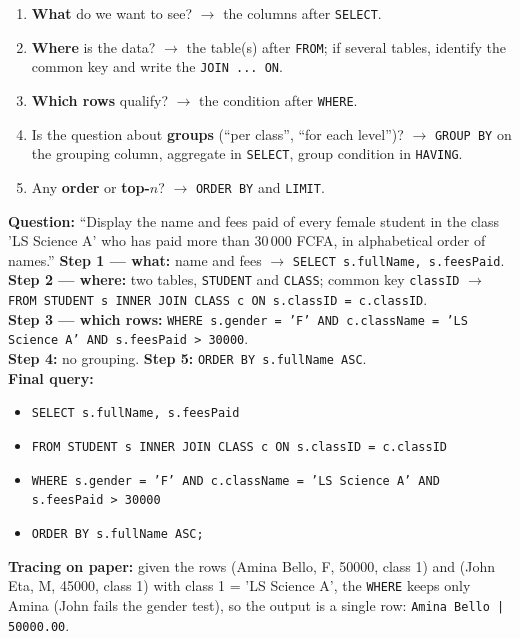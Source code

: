 \documentclass[11pt]{article}
\begin{document}
\begin{methode}
\begin{enumerate}
\item \textbf{What} do we want to see? $\rightarrow$ the columns after \texttt{SELECT}.
\item \textbf{Where} is the data? $\rightarrow$ the table(s) after \texttt{FROM}; if several tables, identify the common key and write the \texttt{JOIN ... ON}.
\item \textbf{Which rows} qualify? $\rightarrow$ the condition after \texttt{WHERE}.
\item Is the question about \textbf{groups} (``per class'', ``for each level'')? $\rightarrow$ \texttt{GROUP BY} on the grouping column, aggregate in \texttt{SELECT}, group condition in \texttt{HAVING}.
\item Any \textbf{order} or \textbf{top-$n$}? $\rightarrow$ \texttt{ORDER BY} and \texttt{LIMIT}.
\end{enumerate}
\end{methode}

\begin{exoresolu}
\textbf{Question:} ``Display the name and fees paid of every female student in the class 'LS Science A' who has paid more than 30\,000 FCFA, in alphabetical order of names.''
\tcblower
\textbf{Step 1 --- what:} name and fees $\rightarrow$ \texttt{SELECT s.fullName, s.feesPaid}.\\
\textbf{Step 2 --- where:} two tables, \texttt{STUDENT} and \texttt{CLASS}; common key \texttt{classID} $\rightarrow$ \texttt{FROM STUDENT s INNER JOIN CLASS c ON s.classID = c.classID}.\\
\textbf{Step 3 --- which rows:} \texttt{WHERE s.gender = 'F' AND c.className = 'LS Science A' AND s.feesPaid > 30000}.\\
\textbf{Step 4:} no grouping. \textbf{Step 5:} \texttt{ORDER BY s.fullName ASC}.\\[2pt]
\textbf{Final query:}
\begin{itemize}
\item \texttt{SELECT s.fullName, s.feesPaid}
\item \texttt{FROM STUDENT s INNER JOIN CLASS c ON s.classID = c.classID}
\item \texttt{WHERE s.gender = 'F' AND c.className = 'LS Science A' AND s.feesPaid > 30000}
\item \texttt{ORDER BY s.fullName ASC;}
\end{itemize}
\textbf{Tracing on paper:} given the rows (Amina Bello, F, 50000, class 1) and (John Eta, M, 45000, class 1) with class 1 = 'LS Science A', the \texttt{WHERE} keeps only Amina (John fails the gender test), so the output is a single row: \texttt{Amina Bello | 50000.00}.
\end{exoresolu}
\end{document}
